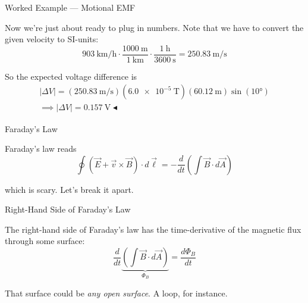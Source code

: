 \documentclass{beamer}
\begin{document}
\begin{frame}{Worked Example --- Motional EMF}

Now we're just about ready to plug in numbers. Note that we have to convert the given velocity to SI-units:
\begin{equation*}
    \SI{903}{\kilo\metre/\hour} \cdot \frac{\SI{1000}{\metre}}{\SI{1}{\kilo\metre}} \cdot \frac{\SI{1}{\hour}}{\SI{3600}{\second}} = \SI{250.83}{\metre/\second} 
\end{equation*}

So the expected voltage difference is
\begin{gather*}
    \left| \Delta V \right| = \left( \SI{250.83}{\metre/\second} \right) \left( \SI{6.0e-5}{\tesla} \right) \left( \SI{60.12}{\metre} \right) \sin{\left( \ang{10} \right)} \\
    \implies \boxed{\big| \Delta V \big| = \SI{0.157}{\volt}} \blacktriangleleft
\end{gather*}

\end{frame}

\begin{frame}{Faraday's Law}

Faraday's law reads
\begin{equation*}
    \oint \left( \vec{E} + \vec{v} \times \vec{B} \right) \cdot d\vec{\ell} = -\frac{d}{dt} \left( \int \vec{B} \cdot d\vec{A} \right)
\end{equation*}

which is scary. Let's break it apart.

\end{frame}

\begin{frame}{Right-Hand Side of Faraday's Law}

The right-hand side of Faraday's law has the time-derivative of the magnetic flux through some surface:
\begin{equation*}
    \frac{d}{dt} \underbrace{\left( \int \vec{B} \cdot d\vec{A} \right)}_{\Phi_B} = \frac{d\Phi_B}{dt}
\end{equation*}

That surface could be \emph{any open surface}. A loop, for instance.

\end{frame}
\end{document}
